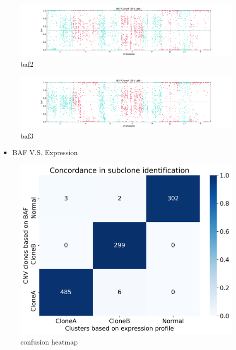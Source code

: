 \documentclass[
]{book}
\providecommand{\tightlist}{%
  \setlength{\itemsep}{0pt}\setlength{\parskip}{0pt}}
\begin{document}
\begin{figure}
\centering
\includegraphics[width=1.2\textwidth,height=\textheight]{./CNV_analysis_file/figs/tnbc1-baf/1sub_chr.pdf}
\caption{baf2}
\end{figure}

\begin{figure}
\centering
\includegraphics[width=1.2\textwidth,height=\textheight]{./CNV_analysis_file/figs/tnbc1-baf/2sub_chr.pdf}
\caption{baf3}
\end{figure}

\begin{itemize}
\tightlist
\item
  BAF V.S. Expression
\end{itemize}

\begin{figure}
\centering
\includegraphics{CNV_analysis_file/figs/BAFvsExpression.png}
\caption{confusion heatmap}
\end{figure}
\end{document}
